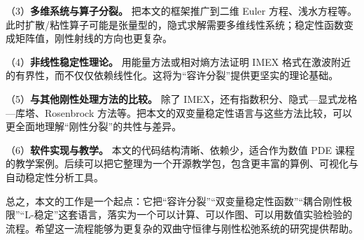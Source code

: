 （3）\textbf{多维系统与算子分裂。} 把本文的框架推广到二维 Euler 方程、浅水方程等。此时扩散/粘性算子可能是张量型的，隐式求解需要多维线性系统；稳定性函数变成矩阵值，刚性射线的方向也更复杂。

（4）\textbf{非线性稳定性理论。} 用能量方法或相对熵方法证明 IMEX 格式在激波附近的有界性，而不仅仅依赖线性化。这将为“容许分裂”提供更坚实的理论基础。

（5）\textbf{与其他刚性处理方法的比较。} 除了 IMEX，还有指数积分、隐式—显式龙格—库塔、Rosenbrock 方法等。把本文的双变量稳定性语言与这些方法比较，可以更全面地理解“刚性分裂”的共性与差异。

（6）\textbf{软件实现与教学。} 本文的代码结构清晰、依赖少，适合作为数值 PDE 课程的教学案例。后续可以把它整理为一个开源教学包，包含更丰富的算例、可视化与自动稳定性分析工具。

总之，本文的工作是一个起点：它把“容许分裂”“双变量稳定性函数”“耦合刚性极限”“L-稳定”这套语言，落实为一个可以计算、可以作图、可以用数值实验检验的流程。希望这一流程能够为更复杂的双曲守恒律与刚性松弛系统的研究提供帮助。

